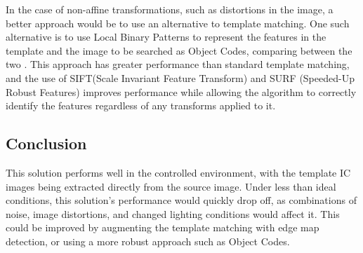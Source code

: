 \documentclass[conference]{IEEEtran}
\begin{document}
In the case of non-affine transformations, such as distortions in the image, a better approach would be to use an alternative to template matching. One such alternative is to use Local Binary Patterns\cite{He1990TextureCU} to represent the features in the template and the image to be searched as Object Codes, comparing between the two \cite{Shen2013AFA}. This approach has greater performance than standard template matching, and the use of SIFT(Scale Invariant Feature Transform)\cite{SIFT} and SURF (Speeded-Up Robust Features)\cite{BAY2008346} improves performance while allowing the algorithm to correctly identify the features regardless of any transforms applied to it.
\subsection{Conclusion}
This solution performs well in the controlled environment, with the template IC images being extracted directly from the source image. Under less than ideal conditions, this solution's performance would quickly drop off, as combinations of noise, image distortions, and changed lighting conditions would affect it. This could be improved by augmenting the template matching with edge map detection, or using a more robust approach such as Object Codes.


%
%

\end{document}
